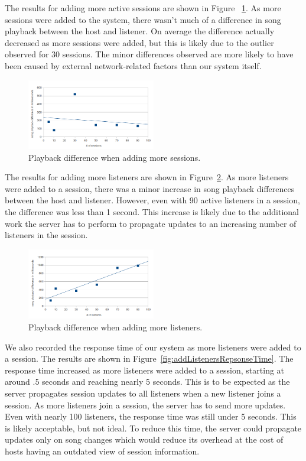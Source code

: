 The results for adding more active sessions are shown in Figure ~\ref{fig:addSessions}. As more sessions were added to the system, there wasn't much of a difference in song playback between the host and listener. On average the difference actually decreased as more sessions were added, but this is likely due to the outlier observed for 30 sessions. The minor differences observed are more likely to have been caused by external network-related factors than our system itself.

\begin{figure}[h]
	\centering
	\includegraphics[width=0.5\textwidth]{add_sessions.png}
	\caption{Playback difference when adding more sessions.}
	\label{fig:addSessions}
\end{figure}

The results for adding more listeners are shown in Figure~\ref{fig:addListeners}. As more listeners were added to a session, there was a minor increase in song playback differences between the host and listener. However, even with 90 active listeners in a session, the difference was less than 1 second. This increase is likely due to the additional work the server has to perform to propagate updates to an increasing number of listeners in the session.

\begin{figure}[h]
	\centering
	\includegraphics[width=0.5\textwidth]{add_listeners.png}
	\caption{Playback difference when adding more listeners.}
	\label{fig:addListeners}
\end{figure}

We also recorded the response time of our system as more listeners were added to a session. The results are shown in Figure~\ref{fig:addListenersRepsonseTime}. The response time increased as more listeners were added to a session, starting at around .5 seconds and reaching nearly 5 seconds. This is to be expected as the server propagates session updates to all listeners when a new listener joins a session. As more listeners join a session, the server has to send more updates. Even with nearly 100 listeners, the response time was still under 5 seconds. This is likely acceptable, but not ideal. To reduce this time, the server could propagate updates only on song changes which would reduce its overhead at the cost of hosts having an outdated view of session information.

